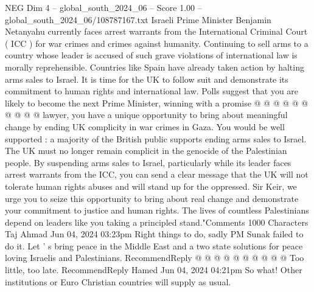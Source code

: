 \begin{textsample}{NEG Dim 4 – global\_south\_2024\_06 – Score 1.00 – global\_south\_2024\_06/108787167.txt}
Israeli Prime Minister Benjamin Netanyahu currently faces arrest warrants from the International Criminal Court ( ICC ) for war crimes and crimes against humanity.
Continuing to sell arms to a country whose leader is accused of such grave violations of international law is morally reprehensible.
Countries like Spain have already taken action by halting arms sales to Israel.
It is time for the UK to follow suit and demonstrate its commitment to human rights and international law.
Polls suggest that you are likely to become the next Prime Minister, winning with a promise @ @ @ @ @ @ @ @ @ @ lawyer, you have a unique opportunity to bring about meaningful change by ending UK complicity in war crimes in Gaza.
You would be well supported : a majority of the British public supports ending arms sales to Israel.
The UK must no longer remain complicit in the genocide of the Palestinian people.
By suspending arms sales to Israel, particularly while its leader faces arrest warrants from the ICC, you can send a clear message that the UK will not tolerate human rights abuses and will stand up for the oppressed.
Sir Keir, we urge you to seize this opportunity to bring about real change and demonstrate your commitment to justice and human rights.
The lives of countless Palestinians depend on leaders like you taking a principled stand."Comments 1000 Characters Taj Ahmad Jun 04, 2024 03:23pm Right things to do, sadly PM Sunak failed to do it.
Let ' s bring peace in the Middle East and a two state solutions for peace loving Israelis and Palestinians.
RecommendReply @ @ @ @ @ @ @ @ @ @ Too little, too late.
RecommendReply Hamed Jun 04, 2024 04:21pm So what!
Other institutions or Euro Christian countries will supply as usual.

\end{textsample}
